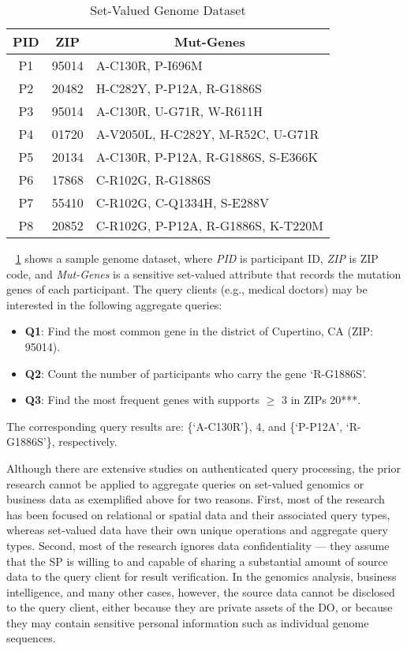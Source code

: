 \begin{table}[t]
  \centering
  \begin{tabular}{ccl}
    \toprule
    \textbf{PID} & \textbf{ZIP} & \multicolumn{1}{c}{\textbf{Mut-Genes}}\\
    \midrule
    P1&95014&A-C130R, P-I696M\\
    P2&20482&H-C282Y, P-P12A, R-G1886S \\
    P3&95014&A-C130R, U-G71R, W-R611H\\
    P4&01720&A-V2050L, H-C282Y, M-R52C, U-G71R\\
    P5&20134&A-C130R, P-P12A, R-G1886S, S-E366K\\
    P6&17868& C-R102G, R-G1886S\\
    P7&55410&C-R102G, C-Q1334H, S-E288V\\
    P8&20852&C-R102G, P-P12A, R-G1886S, K-T220M\\
    \bottomrule
  \end{tabular}
  \caption{Set-Valued Genome Dataset}\label{tab:intro:sample_pgp}
\end{table}

\begin{example}~\label{example:intro:pgp}
  \cref{tab:intro:sample_pgp} shows a sample genome dataset, where \emph{PID} is participant ID, \emph{ZIP} is ZIP code, and \emph{Mut-Genes} is a sensitive set-valued attribute that records the mutation genes of each participant. The query clients (e.g., medical doctors) may be interested in the following aggregate queries:
    \begin{itemize}
      \item \textbf{Q1}: Find the most common gene in the district of Cupertino, CA (ZIP\@: 95014).
      \item \textbf{Q2}: Count the number of participants who carry the gene `R-G1886S'.
      \item \textbf{Q3}: Find the most frequent genes with supports $\ge$ 3 in ZIPs 20***.
    \end{itemize}
    The corresponding query results are: \{`A-C130R'\}, 4, and \{`P-P12A', `R-G1886S'\}, respectively.
\end{example}

Although there are extensive studies on authenticated query processing, the prior research cannot be applied to aggregate queries on set-valued genomics or business data as exemplified above for two reasons. First, most of the research has been focused on relational or spatial data and their associated query types, whereas set-valued data have their own unique operations and aggregate query types. Second, most of the research ignores data confidentiality --- they assume that the SP is willing to and capable of sharing a substantial amount of source data to the query client for result verification. In the genomics analysis, business intelligence, and many other cases, however, the source data cannot be disclosed to the query client, either because they are private assets of the DO, or because they may contain sensitive personal information such as individual genome sequences.

